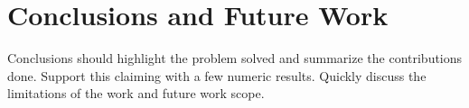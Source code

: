 \chapter{Conclusions and Future Work}
\label{chapter:conclusion}

Conclusions should highlight the problem solved and summarize the contributions done. Support this claiming with a few numeric results. Quickly discuss the limitations of the work and future work scope.
